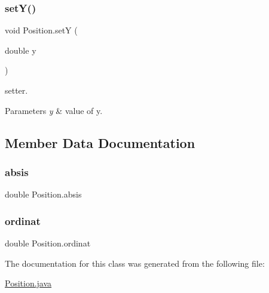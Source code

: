 \subsubsection{\texorpdfstring{set\+Y()}{setY()}}
{\footnotesize\ttfamily void Position.\+setY (\begin{DoxyParamCaption}\item[{double}]{y }\end{DoxyParamCaption})\hspace{0.3cm}{\ttfamily [inline]}}

setter. 
\begin{DoxyParams}{Parameters}
{\em y} & value of y. \\
\hline
\end{DoxyParams}


\subsection{Member Data Documentation}
\mbox{\label{class_position_a27a946f30bd667f0eebe00d192936af3}} 
\subsubsection{\texorpdfstring{absis}{absis}}
{\footnotesize\ttfamily double Position.\+absis\hspace{0.3cm}{\ttfamily [protected]}}

\mbox{\label{class_position_a86ad71df5effd806afc43cce08f235d1}} 
\subsubsection{\texorpdfstring{ordinat}{ordinat}}
{\footnotesize\ttfamily double Position.\+ordinat\hspace{0.3cm}{\ttfamily [protected]}}



The documentation for this class was generated from the following file\+:\begin{DoxyCompactItemize}
\item 
\mbox{\hyperlink{_position_8java}{Position.\+java}}\end{DoxyCompactItemize}
